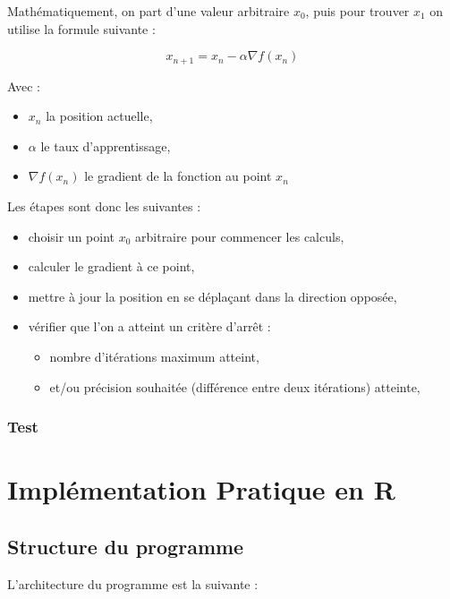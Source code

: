 \documentclass[10pt,french]{report}
\begin{document}
    Mathématiquement, on part d'une valeur arbitraire $x_0$, puis pour trouver $x_1$ on utilise la formule suivante :

    \begin{equation}
        x_{n+1} = x_n - \alpha \nabla f\left(x_n\right)
    \end{equation}

    Avec :
    \begin{itemize}
        \item $x_n$ la position actuelle,
        \item $\alpha$ le taux d'apprentissage,
        \item $\nabla f\left(x_n\right)$ le gradient de la fonction au point $x_n$
    \end{itemize}

    Les étapes sont donc les suivantes :
    \begin{itemize}
        \item choisir un point $x_0$ arbitraire pour commencer les calculs,
        \item calculer le gradient à ce point,
        \item mettre à jour la position en se déplaçant dans la direction opposée,
        \item vérifier que l'on a atteint un critère d'arrêt :
        \begin{itemize}
            \item nombre d'itérations maximum atteint,
            \item et/ou précision souhaitée (différence entre deux itérations) atteinte,
        \end{itemize}
    \end{itemize}

	\subsection{Test}

	\chapter{Implémentation Pratique en R}

	\section{Structure du programme}

	L'architecture du programme est la suivante :
\end{document}
